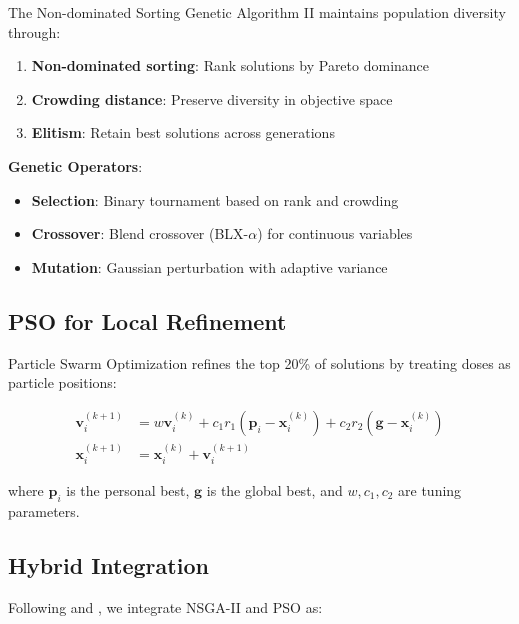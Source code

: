 \documentclass[12pt, a4paper]{article}
\begin{document}
The Non-dominated Sorting Genetic Algorithm II \citep{Deb2002} maintains population diversity through:

\begin{enumerate}
    \item \textbf{Non-dominated sorting}: Rank solutions by Pareto dominance
    \item \textbf{Crowding distance}: Preserve diversity in objective space
    \item \textbf{Elitism}: Retain best solutions across generations
\end{enumerate}

\textbf{Genetic Operators}:
\begin{itemize}
    \item \textbf{Selection}: Binary tournament based on rank and crowding
    \item \textbf{Crossover}: Blend crossover (BLX-$\alpha$) for continuous variables
    \item \textbf{Mutation}: Gaussian perturbation with adaptive variance
\end{itemize}

\subsection{PSO for Local Refinement}

Particle Swarm Optimization \citep{Kennedy1995} refines the top 20\% of solutions by treating doses as particle positions:

\begin{align}
\mathbf{v}_i^{(k+1)} &= w \mathbf{v}_i^{(k)} + c_1 r_1 (\mathbf{p}_i - \mathbf{x}_i^{(k)}) + c_2 r_2 (\mathbf{g} - \mathbf{x}_i^{(k)}) \\
\mathbf{x}_i^{(k+1)} &= \mathbf{x}_i^{(k)} + \mathbf{v}_i^{(k+1)}
\end{align}

where $\mathbf{p}_i$ is the personal best, $\mathbf{g}$ is the global best, and $w, c_1, c_2$ are tuning parameters.

\subsection{Hybrid Integration}

Following \citet{HybridMOO2023} and \citet{GPPSO2024}, we integrate NSGA-II and PSO as:
\end{document}
